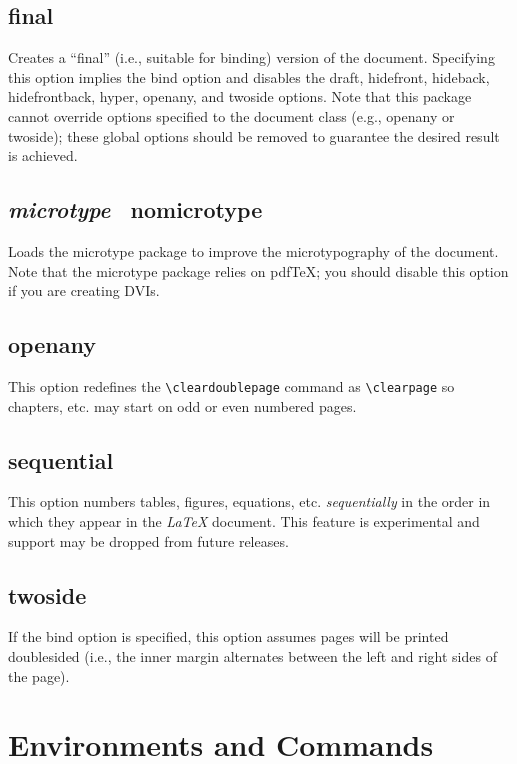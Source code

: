 \documentclass[10pt]{article}
\newcommand{\package}[1]{#1}
\newcommand{\option}[1]{#1}
\newcommand{\default}[1]{\emph{#1}}
\begin{document}
\subsection{\option{final}}
Creates a ``final'' (i.e., suitable for binding) version of the document.
Specifying this option implies the \option{bind} option and disables the \option{draft}, \option{hidefront}, \option{hideback}, \option{hidefrontback}, \option{hyper}, \option{openany}, and \option{twoside} options.
Note that this package cannot override options specified to the document class (e.g., \option{openany} or \option{twoside}); these global options should be removed to guarantee the desired result is achieved.

\subsection{\default{\option{microtype}} \textbar\ \option{nomicrotype}}
Loads the \package{microtype} package to improve the microtypography of the document.
Note that the \package{microtype} package relies on pdf\TeX; you should disable this option if you are creating DVIs.

\subsection{\option{openany}}
This option redefines the \texttt{\textbackslash cleardoublepage} command as \texttt{\textbackslash clearpage} so chapters, etc. may start on odd or even numbered pages.

\subsection{\option{sequential}}
This option numbers tables, figures, equations, etc. \emph{sequentially} in the order in which they appear in the \emph{\LaTeX} document.
This feature is experimental and support may be dropped from future releases.

\subsection{\option{twoside}}
If the bind option is specified, this option assumes pages will be printed doublesided (i.e., the inner margin alternates between the left and right sides of the page).

\section{Environments and Commands}
\end{document}
